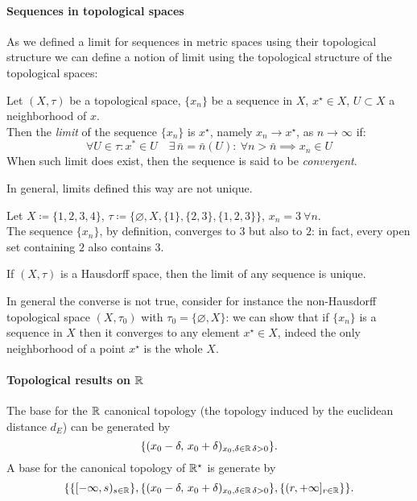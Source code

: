 \paragraph{Sequences in topological spaces} As we defined a limit for sequences in metric spaces using their topological structure we can define a notion of limit using the topological structure of the topological spaces: 
\begin{defn} \label{limit-in-topological-spaces}
	Let $(X, \tau)$ be a topological space, $\{x_n\}$ be a sequence in $X$, $x^\star \in X$, $U \subset X$ a neighborhood of $x$.\\
	Then the \emph{limit} of the sequence $\{x_n\}$ is $x^\star$, namely $x_n\to x^\star$, as $n\to \infty$ if:
	$${\forall U \in \tau : x^* \in U} \quad {\exists \, \bar{n} = \bar{n}(U)} : \ \forall n > \bar{n} \implies x_n \in U$$
	When such limit does exist, then the sequence is said to be \emph{convergent}.
\end{defn}
In general, limits defined this way are not unique.
\begin{exam}
	Let $X \coloneqq \{ 1, 2, 3, 4 \}$, $\tau \coloneqq \{\varnothing, X, \{1\}, \{2, 3\}, \{1, 2, 3\} \}$, $x_n = 3 \ \forall n$. \\
	The sequence $\{x_n\}$, by definition, converges to $3$ but also to $2$: in fact, every open set containing $2$ also contains $3$.
\end{exam}

\begin{prop}
	If $(X, \tau)$ is a Hausdorff space, then the limit of any sequence is unique.
\end{prop}
In general the converse is not true, consider for instance the non-Hausdorff topological space $(X, \tau_0)$ with $\tau_0 = \{\varnothing, X\}$: we can show that if $\{x_n\}$ is a sequence in $X$ then it converges to any element $x^\star \in X$, indeed the only neighborhood of a point $x^\star$ is the whole $X$.

\paragraph{Topological results on $\mathbb R$} The base for the $\mathbb R$ canonical topology (the topology induced by the euclidean distance $d_E$) can be generated by
$$
	\{(x_0-\delta, \, x_0 + \delta)_{x_0, \delta \in \mathbb R \, \delta > 0}\}
.
$$
A base for the canonical topology of $\mathbb R^\star$ is generate by
$$
	\{\{[-\infty,s)_{s \in \mathbb R}\}, \{(x_0-\delta, \, x_0 + \delta)_{x_0, \delta \in \mathbb R \, \delta > 0}\}, \{(r, + \infty]_{r \in \mathbb R}\}\}
.
$$

